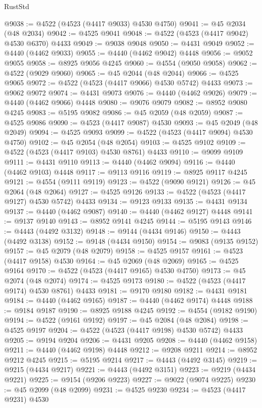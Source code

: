 \begin{lexlean}{RustStd}
\begin{coremodule}
@9038 := @4522 (@4523 (@4417 @9033) @4530 @4750)
@9041 := @45 @2034 (@48 @2034)
@9042 := @4525 @9041
@9048 := @4522 (@4523 (@4417 @9042) @4530 @6370) @4433
@9049 := @9038 @9048
@9050 := @4431 @9049
@9052 := @4440 (@4462 @9033)
@9055 := @4440 (@4462 @9042) @4448
@9056 := @9052 @9055
@9058 := @8925 @9056 @4245
@9060 := @4554 (@9050 @9058)
@9062 := @4522 (@9029 @9060)
@9065 := @45 @2044 (@48 @2044)
@9066 := @4525 @9065
@9072 := @4522 (@4523 (@4417 @9066) @4530 @5742) @4433
@9073 := @9062 @9072
@9074 := @4431 @9073
@9076 := @4440 (@4462 @9026)
@9079 := @4440 (@4462 @9066) @4448
@9080 := @9076 @9079
@9082 := @8952 @9080 @4245
@9083 := @5195 @9082
@9086 := @45 @2059 (@48 @2059)
@9087 := @4525 @9086
@9090 := @4523 (@4417 @9087) @4530
@9093 := @45 @2049 (@48 @2049)
@9094 := @4525 @9093
@9099 := @4522 (@4523 (@4417 @9094) @4530 @4750)
@9102 := @45 @2054 (@48 @2054)
@9103 := @4525 @9102
@9109 := @4522 (@4523 (@4417 @9103) @4530 @8761) @4433
@9110 := @9099 @9109
@9111 := @4431 @9110
@9113 := @4440 (@4462 @9094)
@9116 := @4440 (@4462 @9103) @4448
@9117 := @9113 @9116
@9119 := @8925 @9117 @4245
@9121 := @4554 (@9111 @9119)
@9123 := @4522 (@9090 @9121)
@9126 := @45 @2064 (@48 @2064)
@9127 := @4525 @9126
@9133 := @4522 (@4523 (@4417 @9127) @4530 @5742) @4433
@9134 := @9123 @9133
@9135 := @4431 @9134
@9137 := @4440 (@4462 @9087)
@9140 := @4440 (@4462 @9127) @4448
@9141 := @9137 @9140
@9143 := @8952 @9141 @4245
@9144 := @5195 @9143
@9146 := @4443 (@4492 @3132)
@9148 := @9144 (@4434 @9146)
@9150 := @4443 (@4492 @3138)
@9152 := @9148 (@4434 @9150)
@9154 := @9083 (@9135 @9152)
@9157 := @45 @2079 (@48 @2079)
@9158 := @4525 @9157
@9161 := @4523 (@4417 @9158) @4530
@9164 := @45 @2069 (@48 @2069)
@9165 := @4525 @9164
@9170 := @4522 (@4523 (@4417 @9165) @4530 @4750)
@9173 := @45 @2074 (@48 @2074)
@9174 := @4525 @9173
@9180 := @4522 (@4523 (@4417 @9174) @4530 @8761) @4433
@9181 := @9170 @9180
@9182 := @4431 @9181
@9184 := @4440 (@4462 @9165)
@9187 := @4440 (@4462 @9174) @4448
@9188 := @9184 @9187
@9190 := @8925 @9188 @4245
@9192 := @4554 (@9182 @9190)
@9194 := @4522 (@9161 @9192)
@9197 := @45 @2084 (@48 @2084)
@9198 := @4525 @9197
@9204 := @4522 (@4523 (@4417 @9198) @4530 @5742) @4433
@9205 := @9194 @9204
@9206 := @4431 @9205
@9208 := @4440 (@4462 @9158)
@9211 := @4440 (@4462 @9198) @4448
@9212 := @9208 @9211
@9214 := @8952 @9212 @4245
@9215 := @5195 @9214
@9217 := @4443 (@4492 @3145)
@9219 := @9215 (@4434 @9217)
@9221 := @4443 (@4492 @3151)
@9223 := @9219 (@4434 @9221)
@9225 := @9154 (@9206 @9223)
@9227 := @9022 (@9074 @9225)
@9230 := @45 @2099 (@48 @2099)
@9231 := @4525 @9230
@9234 := @4523 (@4417 @9231) @4530

\end{coremodule}
\end{lexlean}
